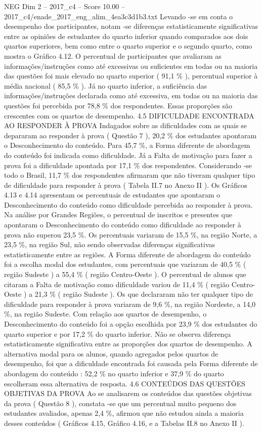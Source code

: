\begin{textsample}{NEG Dim 2 – 2017\_c4 – Score 10.00 – 2017\_c4/enade\_2017\_eng\_alim\_4ea3c3d1b3.txt}
Levando -se em conta o desempenho dos participantes, notam -se diferenças estatisticamente significativas entre as opiniões de estudantes do quarto inferior quando comparados aos dois quartos superiores, bem como entre o quarto superior e o segundo quarto, como mostra o Gráfico 4.12.
O percentual de participantes que avaliaram as informações/instruções como até excessivas ou suficientes em todas ou na maioria das questões foi mais elevado no quarto superior ( 91,1 \% ), percentual superior à média nacional ( 85,5 \% ).
Já no quarto inferior, a suficiência das informações/instruções declarada como até excessiva, em todas ou na maioria das questões foi percebida por 78,8 \% dos respondentes.
Essas proporções são crescentes com os quartos de desempenho. 4.5 DIFICULDADE ENCONTRADA AO RESPONDER À PROVA Indagados sobre as dificuldades com as quais se depararam ao responder à prova ( Questão 7 ), 20,2 \% dos estudantes apontaram o Desconhecimento do conteúdo.
Para 45,7 \%, a Forma diferente de abordagem do conteúdo foi indicada como dificuldade.
Já a Falta de motivação para fazer a prova foi a dificuldade apontada por 17,1 \% dos respondentes.
Considerando -se todo o Brasil, 11,7 \% dos respondentes afirmaram que não tiveram qualquer tipo de dificuldade para responder à prova ( Tabela II.7 no Anexo II ).
Os Gráficos 4.13 e 4.14 apresentam os percentuais de estudantes que apontaram o Desconhecimento do conteúdo como dificuldade percebida ao responder à prova.
Na análise por Grandes Regiões, o percentual de inscritos e presentes que apontaram o Desconhecimento do conteúdo como dificuldade ao responder à prova não superou 23,5 \%.
Os percentuais variaram de 15,5 \%, na região Norte, a 23,5 \%, na região Sul, não sendo observadas diferenças significativas estatisticamente entre as regiões.
A Forma diferente de abordagem do conteúdo foi a escolha modal dos estudantes, com percentuais que variaram de 40,5 \% ( região Sudeste ) a 55,4 \% ( região Centro-Oeste ).
O percentual de alunos que citaram a Falta de motivação como dificuldade variou de 11,4 \% ( região Centro-Oeste ) a 21,3 \% ( região Sudeste ).
Os que declararam não ter qualquer tipo de dificuldade para responder à prova variaram de 9,6 \%, na região Nordeste, a 14,0 \%, na região Sudeste.
Com relação aos quartos de desempenho, o Desconhecimento do conteúdo foi a opção escolhida por 23,9 \% dos estudantes do quarto superior e por 17,2 \% do quarto inferior.
Não se observa diferença estatisticamente significativa entre as proporções dos quartos de desempenho.
A alternativa modal para os alunos, quando agregados pelos quartos de desempenho, foi que a dificuldade encontrada foi causada pela Forma diferente de abordagem do conteúdo : 52,2 \% no quarto inferior e 37,9 \% do quarto escolheram essa alternativa de resposta. 4.6 CONTEÚDOS DAS QUESTÕES OBJETIVAS DA PROVA Ao se analisarem os conteúdos das questões objetivas da prova ( Questão 8 ), constata -se que um percentual muito pequeno dos estudantes avaliados, apenas 2,4 \%, afirmou que não estudou ainda a maioria desses conteúdos ( Gráficos 4.15, Gráfico 4.16, e a Tabelas II.8 no Anexo II ).

\end{textsample}
